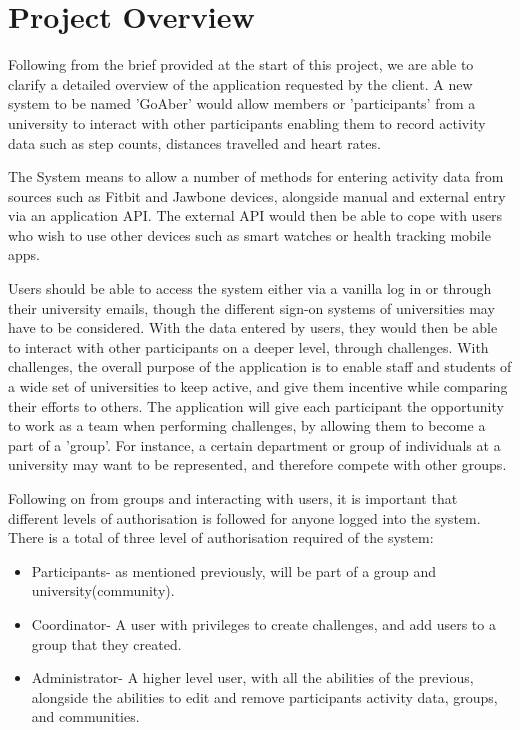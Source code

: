 \chapter{Project Overview}

Following from the brief provided at the start of this project\cite{initialReq}, we are able to clarify a detailed overview of the application requested by the client. A new system to be named 'GoAber' would allow members or 'participants' from a university to interact with other participants enabling them to record activity data such as step counts, distances travelled and heart rates.\par
The System means to allow a number of methods for entering activity data from sources such as Fitbit\cite{fitbit} and Jawbone\cite{jawbone} devices, alongside manual and external entry via an application API. The external API would then be able to cope with users who wish to use other devices such as smart watches or health tracking mobile apps. \par
Users should be able to access the system either via a vanilla log in or through their university emails, though the different sign-on systems of universities may have to be considered. With the data entered by users, they would then be able to interact with other participants on a deeper level, through challenges. With challenges, the overall purpose of the application is to enable staff and students of a wide set of universities to keep active, and give them incentive while comparing their efforts to others. The application will give each participant the opportunity to work as a team when performing challenges, by allowing them to become a part of a 'group'. For instance, a certain department or group of individuals at a university may want to be represented, and therefore compete with other groups. \par
Following on from groups and interacting with users, it is important that different levels of authorisation is followed for anyone logged into the system. There is a total of three level of authorisation required of the system:
\begin{itemize}
\item Participants- as mentioned previously, will be part of a group and university(community).
\item Coordinator- A user with privileges to create challenges, and add users to a group that they created.
\item Administrator- A higher level user, with all the abilities of the previous, alongside the abilities to edit and remove participants activity data, groups, and communities.
\end{itemize}

